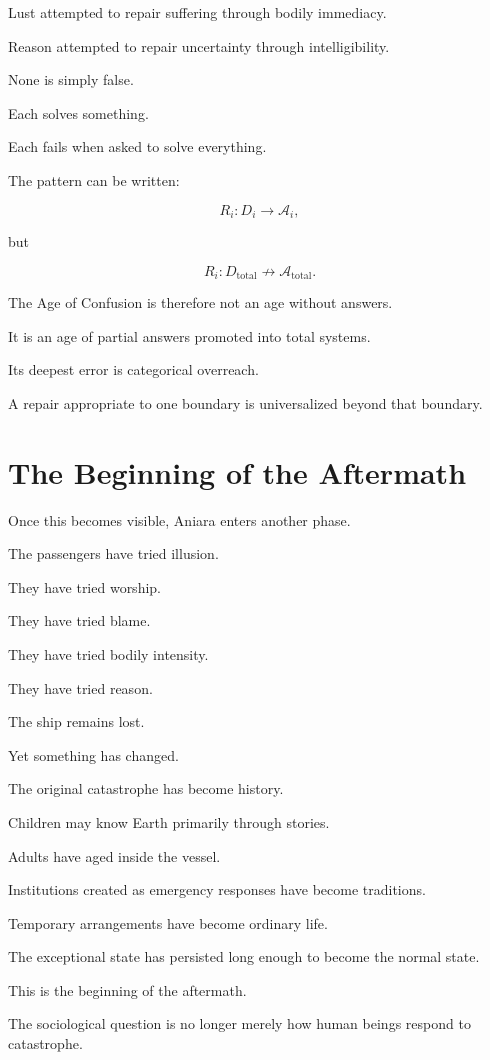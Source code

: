 \documentclass[11pt,oneside]{book}
\theoremstyle{definition}
\theoremstyle{remark}
\newcommand{\A}{\mathcal{A}}
\begin{document}
Lust attempted to repair suffering through bodily immediacy.

Reason attempted to repair uncertainty through intelligibility.

None is simply false.

Each solves something.

Each fails when asked to solve everything.

The pattern can be written:

\[
R_i:
D_i\rightarrow\A_i,
\]

but

\[
R_i:
D_{\mathrm{total}}
\not\rightarrow
\A_{\mathrm{total}}.
\]

The Age of Confusion is therefore not an age without answers.

It is an age of partial answers promoted into total systems.

Its deepest error is categorical overreach.

A repair appropriate to one boundary is universalized beyond that boundary.

\section{The Beginning of the Aftermath}

Once this becomes visible, Aniara enters another phase.

The passengers have tried illusion.

They have tried worship.

They have tried blame.

They have tried bodily intensity.

They have tried reason.

The ship remains lost.

Yet something has changed.

The original catastrophe has become history.

Children may know Earth primarily through stories.

Adults have aged inside the vessel.

Institutions created as emergency responses have become traditions.

Temporary arrangements have become ordinary life.

The exceptional state has persisted long enough to become the normal state.

This is the beginning of the aftermath.

The sociological question is no longer merely how human beings respond to catastrophe.
\end{document}
